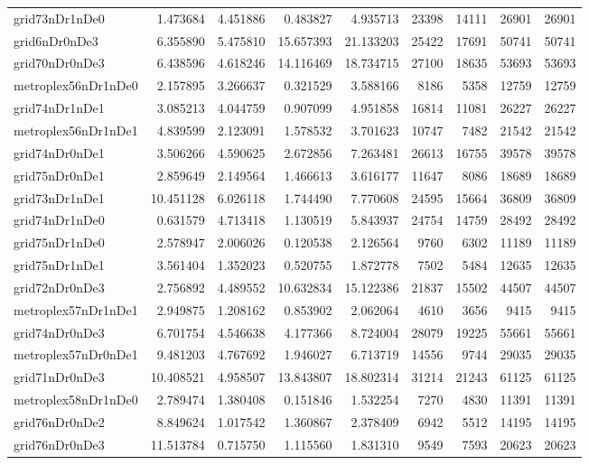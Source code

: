 \begin{longtable}{|l|r|r|r|r|r|r|r|r|}
grid73nDr1nDe0 & 1.473684 & 4.451886 & 0.483827 & 4.935713 & 23398 & 14111 & 26901 & 26901 \\
grid6nDr0nDe3 & 6.355890 & 5.475810 & 15.657393 & 21.133203 & 25422 & 17691 & 50741 & 50741 \\
grid70nDr0nDe3 & 6.438596 & 4.618246 & 14.116469 & 18.734715 & 27100 & 18635 & 53693 & 53693 \\
metroplex56nDr1nDe0 & 2.157895 & 3.266637 & 0.321529 & 3.588166 & 8186 & 5358 & 12759 & 12759 \\
grid74nDr1nDe1 & 3.085213 & 4.044759 & 0.907099 & 4.951858 & 16814 & 11081 & 26227 & 26227 \\
metroplex56nDr1nDe1 & 4.839599 & 2.123091 & 1.578532 & 3.701623 & 10747 & 7482 & 21542 & 21542 \\
grid74nDr0nDe1 & 3.506266 & 4.590625 & 2.672856 & 7.263481 & 26613 & 16755 & 39578 & 39578 \\
grid75nDr0nDe1 & 2.859649 & 2.149564 & 1.466613 & 3.616177 & 11647 & 8086 & 18689 & 18689 \\
grid73nDr1nDe1 & 10.451128 & 6.026118 & 1.744490 & 7.770608 & 24595 & 15664 & 36809 & 36809 \\
grid74nDr1nDe0 & 0.631579 & 4.713418 & 1.130519 & 5.843937 & 24754 & 14759 & 28492 & 28492 \\
grid75nDr1nDe0 & 2.578947 & 2.006026 & 0.120538 & 2.126564 & 9760 & 6302 & 11189 & 11189 \\
grid75nDr1nDe1 & 3.561404 & 1.352023 & 0.520755 & 1.872778 & 7502 & 5484 & 12635 & 12635 \\
grid72nDr0nDe3 & 2.756892 & 4.489552 & 10.632834 & 15.122386 & 21837 & 15502 & 44507 & 44507 \\
metroplex57nDr1nDe1 & 2.949875 & 1.208162 & 0.853902 & 2.062064 & 4610 & 3656 & 9415 & 9415 \\
grid74nDr0nDe3 & 6.701754 & 4.546638 & 4.177366 & 8.724004 & 28079 & 19225 & 55661 & 55661 \\
metroplex57nDr0nDe1 & 9.481203 & 4.767692 & 1.946027 & 6.713719 & 14556 & 9744 & 29035 & 29035 \\
grid71nDr0nDe3 & 10.408521 & 4.958507 & 13.843807 & 18.802314 & 31214 & 21243 & 61125 & 61125 \\
metroplex58nDr1nDe0 & 2.789474 & 1.380408 & 0.151846 & 1.532254 & 7270 & 4830 & 11391 & 11391 \\
grid76nDr0nDe2 & 8.849624 & 1.017542 & 1.360867 & 2.378409 & 6942 & 5512 & 14195 & 14195 \\
grid76nDr0nDe3 & 11.513784 & 0.715750 & 1.115560 & 1.831310 & 9549 & 7593 & 20623 & 20623 \\

\end{longtable}
